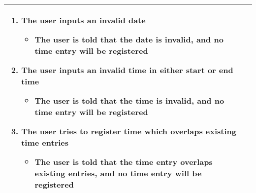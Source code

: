 \begin{table}[H]
\begin{tabular}{|l|l|}
{{\begin{enumerate}
        \item{The user inputs an invalid date}
          \begin{itemize}
          \item {The user is told that the date is invalid, and no time entry will be registered}
          \end{itemize}

        \item{The user inputs an invalid time in either start or end time}
          \begin{itemize}
          \item {The user is told that the time is invalid, and no time entry will be registered}
          \end{itemize}

        \item{The user tries to register time which overlaps existing time entries}
          \begin{itemize}
          \item {The user is told that the time entry overlaps existing entries, and no time entry will be registered}
          \end{itemize}

        \end{enumerate}
      }}
    \\ \hline
  \end{tabular}
\end{table}